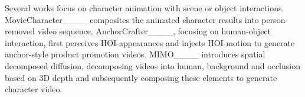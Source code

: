 Several works focus on character animation with scene or object interactions. MovieCharacter____ composites the animated character results into person-removed video sequence. AnchorCrafter____, focusing on human-object interaction, first perceives HOI-appearances and injects HOI-motion to generate anchor-style product promotion videos. MIMO____ introduces spatial decomposed diffusion, decomposing videos into human, background and occlusion based on 3D depth and subsequently composing these elements to generate character video.